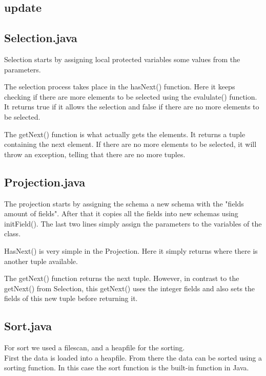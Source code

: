 \documentclass[a4paper,10pt,titlepage]{report}
\begin{document}
\subsection{update}

\subsection{Selection.java}
Selection starts by assigning local protected variables some values from the parameters. 

The selection process takes place in the hasNext() function. Here it keeps checking if there are more elements to be selected using the evalulate() function. It returns true if it allows the selection and false if there are no more elements to be selected.

The getNext() function is what actually gets the elements. It returns a tuple containing the next element. If there are no more elements to be selected, it will throw an exception, telling that there are no more tuples.

\vspace{10mm}
\subsection{Projection.java}
The projection starts by assigning the schema a new schema with the "fields amount of fields". After that it copies all the fields into new schemas using initField(). The last two lines simply assign the parameters to the variables of the class.

HasNext() is very simple in the Projection. Here it simply returns where there is another tuple available.

The getNext() function returns the next tuple. However, in contrast to the getNext() from Selection, this getNext() uses the integer fields and also sets the fields of this new tuple before returning it.



\subsection{Sort.java}
For sort we used a filescan, and a heapfile for the sorting. \\
First the data is loaded into a heapfile. From there the data can be sorted using a sorting function. In this case the sort function is the built-in function in Java.

\end{document}
